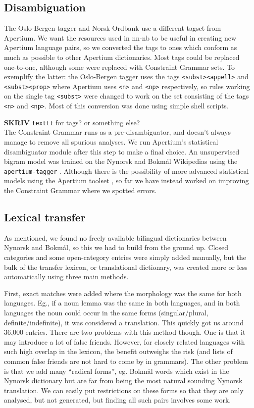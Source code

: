 \documentclass[11pt]{article}
\begin{document}
\subsection{Disambiguation}

The Oslo-Bergen tagger and Norsk Ordbank use a different tagset from
Apertium. We want the resources used in nn-nb to be useful in creating
new Apertium language pairs, so we converted the tags to ones which
conform as much as possible to other Apertium dictionaries. Most tags
could be replaced one-to-one, although some were replaced with
Constraint Grammar sets. To exemplify the latter: the Oslo-Bergen
tagger uses the tags \texttt{<subst><appell>} and
\texttt{<subst><prop>} where Apertium uses \texttt{<n>} and
\texttt{<np>} respectively, so rules working on the single tag
\texttt{<subst>} were changed to work on the set consisting of the
tags \texttt{<n>} and \texttt{<np>}. Most of this conversion was done
using simple shell scripts.

\textbf{SKRIV} \texttt{texttt} for tags? or something else?\\


The Constraint Grammar runs as a pre-disambiguator, and doesn't always
manage to remove all spurious analyses. We run Apertium's statistical
disambiguator module after this step to make a final choice. An
unsupervised bigram model was trained on the Nynorsk and Bokmål
Wikipedias using the \texttt{apertium-tagger} \citep{todo}. Although
there is the possibility of more advanced statistical models using the
Apertium toolset
\citep[see~eg.~][]{sanchez2008utl,sheikh2009trigram}, so far we
have instead worked on improving the Constraint Grammar where we
spotted errors.

\subsection{Lexical transfer}

As mentioned, we found no freely available bilingual dictionaries
between Nynorsk and Bokmål, so this we had to build from the ground
up. Closed categories and some open-category entries were simply added
manually, but the bulk of the transfer lexicon, or translational
dictionary, was created more or less automatically using three main
methods.

First, exact matches were added where the morphology was the same for
both languages. Eg., if a noun lemma was the same in both languages,
and in both languages the noun could occur in the same forms
(singular/plural, definite/indefinite), it was considered a
translation. This quickly got us around 36,000 entries. There are two
problems with this method though. One is that it may introduce a lot
of false friends. However, for closely related languages with such
high overlap in the lexicon, the benefit outweighs the risk (and lists
of common false friends are not hard to come by in grammars). The
other problem is that we add many ``radical forms'', eg. Bokmål words
which exist in the Nynorsk dictionary but are far from being the most
natural sounding Nynorsk translation. We can easily put restrictions
on these forms so that they are only analysed, but not generated, but
finding all such pairs involves some work.
\end{document}
